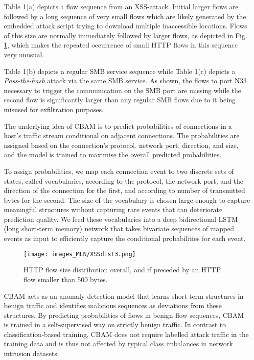 Table 1(a) %
depicts a flow sequence from an XSS-attack. Initial larger flows are followed by a long sequence of very small flows which are likely generated by the embedded attack script  trying to download multiple inaccessible locations. Flows of this size are normally immediately followed by larger flows, as depicted in Fig. \ref{figF:XSSdist}, which makes the repeated occurrence of small HTTP flows in this sequence very unusual. 



Table 1(b) %
depicts a regular SMB service sequence while Table 1(c) %
depicts a \textit{Pass-the-hash} attack via the same SMB service. As shown, the flows to port N33 necessary to trigger the communication on the SMB port are missing while the second flow is significantly larger than any regular SMB flows due to it being misused for exfiltration purposes.




The underlying idea of CBAM is to predict probabilities of connections in a host's traffic stream conditional on adjacent connections. The probabilities are assigned based on the connection's protocol, network port, direction, and size,  and the model is trained to maximise the overall predicted probabilities. 


To assign probabilities, we map each connection event to two discrete sets of states, called vocabularies, according to the protocol, the network port, and the direction of the connection for the first, and according to number of transmitted bytes for the second. The size of the vocabulary is chosen large enough to capture meaningful structures without capturing  rare events that can deteriorate prediction quality. We feed these vocabularies into a deep bidirectional LSTM (long short-term memory) network that takes bivariate sequences of mapped events as input to efficiently capture the conditional probabilities for each event. 
\begin{figure}
\centering
\texttt{[image: images\_MLN/XSSdist3.png]}
\caption{HTTP flow size distribution overall, and if preceded by an HTTP flow smaller than 500 bytes.}\label{figF:XSSdist}
\end{figure}

CBAM acts as an anomaly-detection model that learns short-term structures in benign traffic and identifies malicious sequences as deviations from these structures. 
By predicting probabilities of flows in benign flow sequences, CBAM is trained in a self-supervised way  on strictly benign traffic. In contrast to classification-based training, CBAM does not require labelled attack traffic in the training data and is thus not affected by typical class imbalances in network intrusion datasets. 

